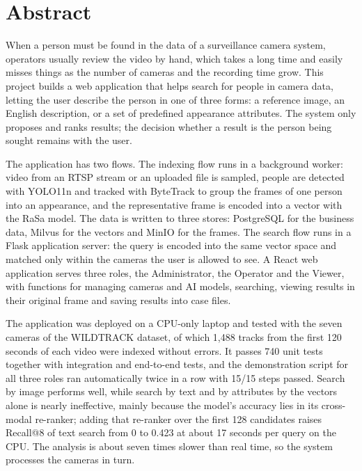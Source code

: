 \chapter*{Abstract}

When a person must be found in the data of a surveillance camera system, operators usually review the video by hand, which takes a long time and easily misses things as the number of cameras and the recording time grow. This project builds a web application that helps search for people in camera data, letting the user describe the person in one of three forms: a reference image, an English description, or a set of predefined appearance attributes. The system only proposes and ranks results; the decision whether a result is the person being sought remains with the user.

The application has two flows. The indexing flow runs in a background worker: video from an RTSP stream or an uploaded file is sampled, people are detected with YOLO11n and tracked with ByteTrack to group the frames of one person into an appearance, and the representative frame is encoded into a vector with the RaSa model. The data is written to three stores: PostgreSQL for the business data, Milvus for the vectors and MinIO for the frames. The search flow runs in a Flask application server: the query is encoded into the same vector space and matched only within the cameras the user is allowed to see. A React web application serves three roles, the Administrator, the Operator and the Viewer, with functions for managing cameras and AI models, searching, viewing results in their original frame and saving results into case files.

The application was deployed on a CPU-only laptop and tested with the seven cameras of the WILDTRACK dataset, of which 1,488 tracks from the first 120 seconds of each video were indexed without errors. It passes 740 unit tests together with integration and end-to-end tests, and the demonstration script for all three roles ran automatically twice in a row with 15/15 steps passed. Search by image performs well, while search by text and by attributes by the vectors alone is nearly ineffective, mainly because the model's accuracy lies in its cross-modal re-ranker; adding that re-ranker over the first 128 candidates raises Recall@8 of text search from 0 to 0.423 at about 17 seconds per query on the CPU. The analysis is about seven times slower than real time, so the system processes the cameras in turn.

